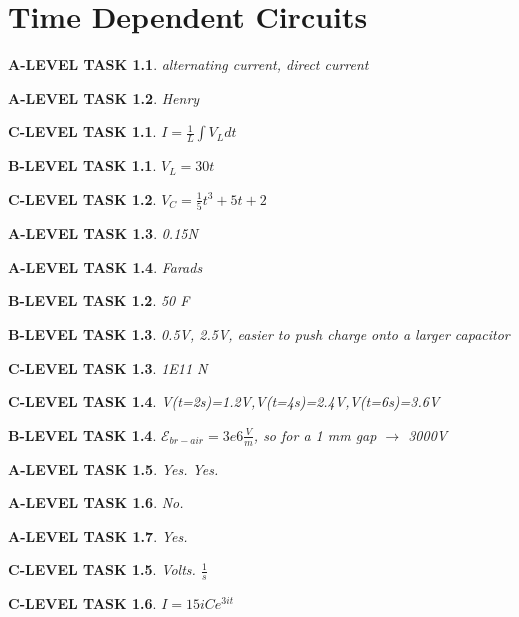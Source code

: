 \documentclass{book}
\numberwithin{equation}{section}
\newtheorem{alevel}{A-LEVEL TASK}
\newtheorem{blevel}{B-LEVEL TASK}
\newtheorem{clevel}{C-LEVEL TASK}
\theoremstyle{definition}
\begin{document}
\setcounter{alevel}{0} \setcounter{blevel}{0} \setcounter{clevel}{0} \setcounter{dlevel}{0}
\chapter{Time Dependent Circuits}
\begin{alevel}alternating current, direct current\end{alevel}
\begin{alevel}Henry\end{alevel}
\begin{clevel}$I=\frac{1}{L}\int{V_L dt}$\end{clevel}
\begin{blevel}$V_L=30t$\end{blevel}
\begin{clevel}$V_C=\frac{1}{5}t^3+5t+2$\end{clevel}
\begin{alevel}0.15N\end{alevel}
\begin{alevel}Farads\end{alevel}
\begin{blevel}50 F\end{blevel}
\begin{blevel}0.5V, 2.5V, easier to push charge onto a larger capacitor\end{blevel}
\begin{clevel}1E11 N\end{clevel}
\begin{clevel}V(t=2s)=1.2V,V(t=4s)=2.4V,V(t=6s)=3.6V \end{clevel}
\begin{blevel}$\mathcal{E}_{br-air}=3e6 \frac{V}{m}$, so for a 1 mm gap $\rightarrow$ 3000V\end{blevel}

\begin{alevel}Yes. Yes.\end{alevel}
\begin{alevel}No.\end{alevel}
\begin{alevel}Yes.\end{alevel}
\begin{clevel}Volts. $\frac{1}{s}$\end{clevel}
\begin{clevel}$I=15iCe^{3it}$\end{clevel}
\end{document}
